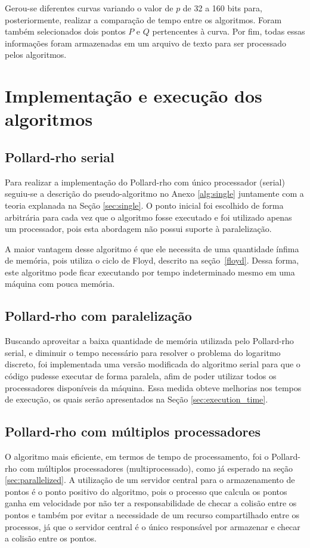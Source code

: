 Gerou-se diferentes curvas variando o valor de \(p\) de 32 a 160 bits para, posteriormente, realizar a comparação de tempo entre os algoritmos. Foram também selecionados dois pontos \(P\) e \(Q\) pertencentes à curva. Por fim, todas essas informações foram armazenadas em um arquivo de texto para ser processado pelos algoritmos.

\section{Implementação e execução dos algoritmos}

\subsection{Pollard-rho serial}
Para realizar a implementação do Pollard-rho com único processador (serial) seguiu-se a descrição do pseudo-algoritmo no Anexo \ref{alg:single} juntamente com a teoria explanada na Seção \ref{sec:single}. O ponto inicial foi escolhido de forma arbitrária para cada vez que o algoritmo fosse executado e foi utilizado apenas um processador, pois esta abordagem não possui suporte à paralelização.

A maior vantagem desse algoritmo é que ele necessita de uma quantidade ínfima de memória, pois utiliza o ciclo de Floyd, descrito na seção~\ref{floyd}. Dessa forma, este algoritmo pode ficar executando por tempo indeterminado mesmo em uma máquina com pouca memória.

\subsection{Pollard-rho com paralelização}
Buscando aproveitar a baixa quantidade de memória utilizada pelo Pollard-rho serial, e diminuir o tempo necessário para resolver o problema do logaritmo discreto, foi implementada uma versão modificada do algoritmo serial para que o código pudesse executar de forma paralela, afim de poder utilizar todos os processadores disponíveis da máquina. Essa medida obteve melhorias nos tempos de execução, os quais serão apresentados na Seção \ref{sec:execution_time}.

\subsection{Pollard-rho com múltiplos processadores}
O algoritmo mais eficiente, em termos de tempo de processamento, foi o Pollard-rho com múltiplos processadores (multiprocessado), como já esperado na seção \ref{sec:parallelized}. A utilização de um servidor central para o armazenamento de pontos é o ponto positivo do algoritmo, pois o processo que calcula os pontos ganha em velocidade por não ter a responsabilidade de checar a colisão entre os pontos e também por evitar a necessidade de um recurso compartilhado entre os processos, já que o servidor central é o único responsável por armazenar e checar a colisão entre os pontos. 

